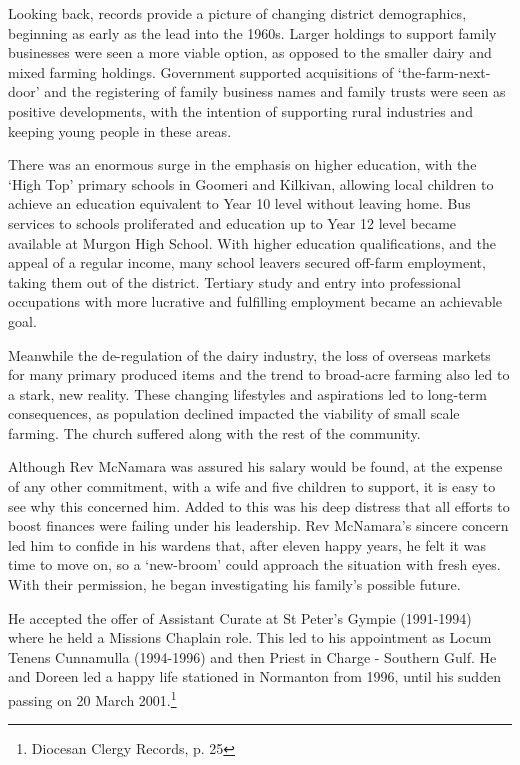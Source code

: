 Looking back, records provide a picture of changing district demographics, beginning as early as the lead into the 1960s. Larger holdings to support family businesses were seen a more viable option, as opposed to the smaller dairy and mixed farming holdings. Government supported acquisitions of `the-farm-next-door' and the registering of family business names and family trusts were seen as positive developments, with the intention of supporting rural industries and keeping young people in these areas.



There was an enormous surge in the emphasis on higher education, with the `High Top' primary schools in Goomeri and Kilkivan, allowing local children to achieve an education equivalent to Year 10 level without leaving home. Bus services to schools proliferated and education up to Year 12 level became available at Murgon High School. With higher education qualifications, and the appeal of a regular income, many school leavers secured off-farm employment, taking them out of the district. Tertiary study and entry into professional occupations with more lucrative and fulfilling employment became an achievable goal.



Meanwhile the de-regulation of the dairy industry, the loss of overseas markets for many primary produced items and the trend to broad-acre farming also led to a stark, new reality. These changing lifestyles and aspirations led to long-term consequences, as population declined impacted the viability of small scale farming. The church suffered along with the rest of the community.



Although Rev McNamara was assured his salary would be found, at the expense of any other commitment, with a wife and five children to support, it is easy to see why this concerned him. Added to this was his deep distress that all efforts to boost finances were failing under his leadership. Rev McNamara's sincere concern led him to confide in his wardens that, after eleven happy years, he felt it was time to move on, so a `new-broom' could approach the situation with fresh eyes. With their permission, he began investigating his family's possible future.



He accepted the offer of Assistant Curate at St Peter's Gympie (1991-1994) where he held a Missions Chaplain role. This led to his appointment as Locum Tenens Cunnamulla (1994-1996) and then Priest in Charge - Southern Gulf. He and Doreen led a happy life stationed in Normanton from 1996, until his sudden passing on 20 March 2001.\footnote{Diocesan Clergy Records, p. 25}


